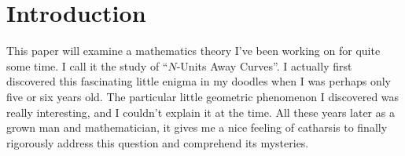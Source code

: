 \section{Introduction}

This paper will examine a mathematics theory I’ve been working on for quite some time. I call it the study of ``$N$-Units Away Curves''. I actually first discovered this fascinating little enigma in my doodles when I was perhaps only five or six years old. The particular little geometric phenomenon I discovered was really interesting, and I couldn’t explain it at the time. All these years later as a grown man and mathematician, it gives me a nice feeling of catharsis to finally rigorously address this question and comprehend its mysteries.

\newcommand\w{.40\linewidth}
\newcommand\fw{.90\textwidth}

